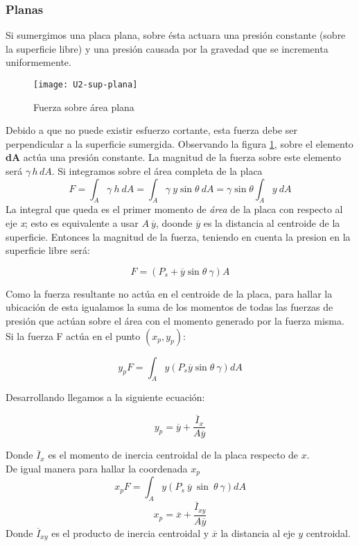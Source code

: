 \subsubsection{Planas}
Si sumergimos una placa plana, sobre ésta actuara una presión constante (sobre la superficie libre) y una presión causada por la gravedad que se incrementa uniformemente.
\begin{figure}[h]
	\centering
	\texttt{[image: U2-sup-plana]}
	\caption{Fuerza sobre área plana}
	\label{fig:sup-plana}
\end{figure}
Debido a que no puede existir esfuerzo cortante, esta fuerza debe ser perpendicular a la superficie sumergida. Observando la figura \ref{fig:sup-plana}, sobre el elemento \textbf{dA} actúa una presión constante. La magnitud de la fuerza sobre este elemento será $\gamma \, h \, dA$. Si integramos sobre el área completa de la placa
\begin{equation*}
	F = \int_{A} \gamma \ h \ dA = \int_{A} \gamma \ y \sin \theta \ dA =  \gamma \sin \theta \int_{A} y \ dA
\end{equation*}
La integral que queda es el primer momento de \emph{área} de la placa con respecto al eje \emph{x}; esto es equivalente a usar \textbf{$A \ \overline{y}$}, doonde $\overline{y}$ es la distancia al centroide de la superficie. Entonces la magnitud de la fuerza, teniendo en cuenta la presion en la superficie libre será:

\begin{equation}
	F =(P_{s} + \overline{y} \sin \theta \ \gamma) A
\end{equation}

Como la fuerza resultante no actúa en el centroide de la placa, para hallar la ubicación de esta igualamos la suma de los momentos de todas las fuerzas de presión que actúan sobre el área con el momento generado por la fuerza misma. Si la fuerza F actúa en el punto $(x_{p}, y_{p})$:

\begin{equation*}
	y_{p} F = \int_{A} y (P_{s} \overline{y} \sin \theta \ \gamma ) dA
\end{equation*}

Desarrollando llegamos a la siguiente ecuación:

\begin{equation}
	y_{p} = \overline{y} + \dfrac{\overline{I}_{x}}{A \overline{y}}
\end{equation}

Donde $\overline{I}_{x}$ es el momento de inercia centroidal de la placa respecto de $x$.
\\
De igual manera para hallar la coordenada $x_{p}$
\begin{equation*}
	x_{p} F = \int_{A} y (P_{s} \ \overline{y} \ \sin \ \theta \ \gamma ) dA
\end{equation*}
\begin{equation}
	x_{p} = \overline{x} + \dfrac{\overline{I}_{xy}}{A \overline{y}}
\end{equation}
Donde $\overline{I}_{xy}$ es el producto de inercia centroidal y $\overline{x}$ la distancia al eje $y$ centroidal.
